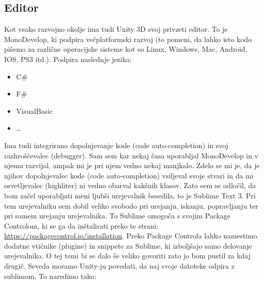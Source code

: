 {\color{indiagreen}\subsection{Editor}}
Kot vsako razvojno okolje ima tudi Unity 3D svoj privzeti editor. To je MonoDevelop, ki podpira večplatformski razvoj (to pomeni, da lahko isto kodo pišemo za različne operacijske sisteme kot so Linux, Windows, Mac, Android, IOS, PS3 itd.). Podpira naslednje jezika: \\
\begin{itemize}
	\item C\#
	\item F\#
	\item VisualBasic
	\item \dots
\end{itemize}
Ima tudi integrirano dopolnjevanje kode (code auto-completion) in svoj razhroščevalec (debugger). Sam sem kar nekaj časa uporabljal MonoDevelop in v njemu razvijal, ampak mi je pri njem vedno nekaj manjkalo. Zdelo se mi je, da je njihov dopolnjevalec kode (code auto-completion) vsiljeval svoje stvari in da mi osvetljevalec (highliter) ni vedno obarval kakšnih klasov. Zato sem se odločil, da bom začel uporabljati meni ljubši urejevalnik besedila, to je Sublime Text 3. Pri tem urejevalniku sem dobil veliko svobodo pri urejanju, iskanju, popravljanju ter pri samem urejanju urejevalnika. To Sublime omogoča s svojim Package Controlom, ki se ga da inštalirati preko te strani: \url{https://packagecontrol.io/installation}. Preko Package Controla lahko namestimo dodatne vtičnike (plugine) in snippete za Sublime, ki izboljšajo samo delovanje urejevalnika. O tej temi bi se dalo še veliko govoriti zato jo bom pustil za kdaj drugič. Seveda moramo Unity-ju povedati, da naj svoje datoteke odpira z sublimom. To naredimo tako:\\
